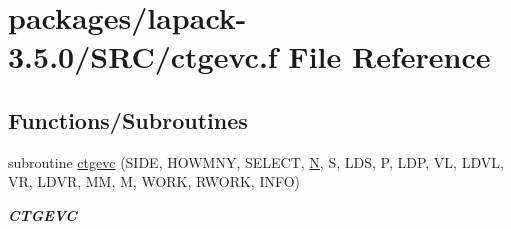 \hypertarget{ctgevc_8f}{}\section{packages/lapack-\/3.5.0/\+S\+R\+C/ctgevc.f File Reference}
\label{ctgevc_8f}
\subsection*{Functions/\+Subroutines}
\begin{DoxyCompactItemize}
\item 
subroutine \hyperlink{group__complexGEcomputational_gac7a0174fe570275f9380f138d536014e}{ctgevc} (S\+I\+D\+E, H\+O\+W\+M\+N\+Y, S\+E\+L\+E\+C\+T, \hyperlink{polmisc_8c_a0240ac851181b84ac374872dc5434ee4}{N}, S, L\+D\+S, P, L\+D\+P, V\+L, L\+D\+V\+L, V\+R, L\+D\+V\+R, M\+M, M, W\+O\+R\+K, R\+W\+O\+R\+K, I\+N\+F\+O)
\begin{DoxyCompactList}\small\item\em {\bfseries C\+T\+G\+E\+V\+C} \end{DoxyCompactList}\end{DoxyCompactItemize}
